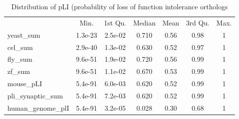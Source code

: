 \begin{table}[ht]
    \centering
    \begin{tabular}{lcccccc}
    &                 Min.& 1st Qu. &Median& Mean& 3rd Qu.& Max.\\
yeast\_sum   &     1.3e-23& 2.5e-02&  0.710& 0.56&    0.98 &   1\\
cel\_sum     &     2.9e-40& 1.3e-02&  0.630& 0.52&    0.97 &  1\\
fly\_sum      &    9.6e-51 &1.9e-02&  0.720& 0.56&    0.99 &  1\\
zf\_sum        &   9.6e-51& 1.1e-02&  0.670& 0.53&    0.99  &  1\\
mouse\_pLI      &  5.4e-91 &6.0e-03&  0.620& 0.52&    0.99   &1\\
pli\_synaptic\_sum & 5.4e-91 &7.2e-03&  0.620& 0.52&    0.99  &  1\\
human\_genome\_plI &5.4e-91 &3.2e-05&  0.028& 0.30&    0.68  &  1\\
  
    \end{tabular}
    \caption{Distribution of pLI (probability of loss of function intolerance orthologs}
    \label{tab:pLI orthologs}
\end{table}



